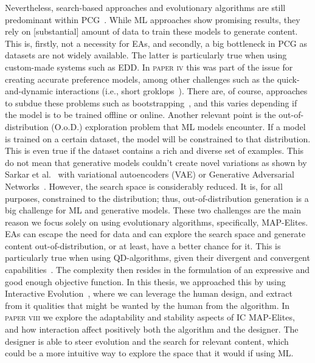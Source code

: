 Nevertheless, search-based approaches and evolutionary algorithms are still predominant within PCG~\cite{liapis_10_2020}. While ML approaches show promising results, they rely on [substantial] amount of data to train these models to generate content. This is, firstly, not a necessity for EAs, and secondly, a big bottleneck in PCG as datasets are not widely available. The latter is particularly true when using custom-made systems such as EDD. In \textsc{paper iv} this was part of the issue for creating accurate preference models, among other challenges such as the quick-and-dynamic interactions (i.e., short groklops~\cite{compton_casual_2015}). There are, of course, approaches to subdue these problems such as bootstrapping~\cite{torrado_bootstrapping_2020}, and this varies depending if the model is to be trained offline or online. Another relevant point is the out-of-distribution (O.o.D.) exploration problem that ML models encounter. If a model is trained on a certain dataset, the model will be constrained to that distribution. This is even true if the dataset contains a rich and diverse set of examples. This do not mean that generative models couldn't create novel variations as shown by Sarkar et al.~\cite{sarkar_generating_2021} with variational autoencoders (VAE) or Generative Adversarial Networks~\cite{goodfellow_deep_2016}. However, the search space is considerably reduced. It is, for all purposes, constrained to the distribution; thus, out-of-distribution generation is a big challenge for ML and generative models. These two challenges are the main reason we focus solely on using evolutionary algorithms, specifically, MAP-Elites. EAs can escape the need for data and can explore the search space and generate content out-of-distribution, or at least, have a better chance for it. This is particularly true when using QD-algorithms, given their divergent and convergent capabilities~\cite{pugh_quality_2016}. The complexity then resides in the formulation of an expressive and good enough objective function. In this thesis, we approached this by using Interactive Evolution~\cite{takagi_interactive_2001}, where we can leverage the human design, and extract from it qualities that might be wanted by the human from the algorithm. In \textsc{paper viii} we explore the adaptability and stability aspects of IC MAP-Elites, and how interaction affect positively both the algorithm and the designer. The designer is able to steer evolution and the search for relevant content, which could be a more intuitive way to explore the space that it would if using ML.

